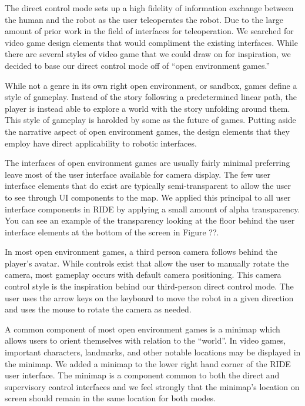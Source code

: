 The direct control mode sets up a high fidelity of information exchange between the human and the robot as the user teleoperates the robot. Due to the large amount of prior work in the field of interfaces for teleoperation. We searched for video game design elements that would compliment the existing interfaces. While there are several styles of video game that we could draw on for inspiration, we decided to base our direct control mode off of ``open environment games.''

While not a genre in its own right open environment, or sandbox, games define a style of gameplay. Instead of the story following a predetermined linear path, the player is instead able to explore a world with the story unfolding around them. This style of gameplay is harolded by some as the future of games. Putting aside the narrative aspect of open environment games, the design elements that they employ have direct applicability to robotic interfaces.

The interfaces of open environment games are usually fairly minimal preferring leave most of the user interface available for camera display. The few user interface elements that do exist are typically semi-transparent to allow the user to see through UI components to the map. We applied this principal to all user interface components in RIDE by applying a small amount of alpha transparency. You can see an example of the transparency looking at the floor behind the user interface elements at the bottom of the screen in Figure ??. 

In most open environment games, a third person camera follows behind the player's avatar. While controls exist that allow the user to manually rotate the camera, most gameplay occurs with default camera positioning. This camera control style is the inspiration behind our third-person direct control mode. The user uses the arrow keys on the keyboard to move the robot in a given direction and uses the mouse to rotate the camera as needed.

A common component of most open environment games is a minimap which allows users to orient themselves with relation to the ``world''. In video games, important characters, landmarks, and other notable locations may be displayed in the minimap. We added a minimap to the lower right hand corner of the RIDE user interface. The minimap is a component common to both the direct and supervisory control interfaces and we feel strongly that the minimap's location on screen should remain in the same location for both modes.

